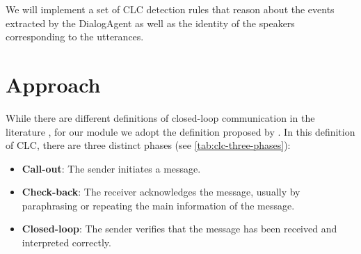 We will implement a set of CLC detection rules that reason about the events
extracted by the DialogAgent as well as the identity of the speakers
corresponding to the utterances.


\section{Approach}

While there are different definitions of closed-loop communication in the
literature \cite{abd2018closed, yee2017role}, for our module we adopt the
definition proposed by \citet{Hargestam.ea:2013}.  In this definition of CLC,
there are three distinct phases (see \autoref{tab:clc-three-phases}):

\begin{itemize}

    \item \textbf{Call-out}: The sender initiates a message.

    \item \textbf{Check-back}: The receiver acknowledges the message, usually
        by paraphrasing or repeating the main information of the message.

    \item \textbf{Closed-loop}: The sender verifies that the message has been
                received and interpreted correctly.

\end{itemize}

\newcommand{\utteranceone}{\textit{This is Green. I’m finishing this side, blue, could you check the central for victims? }}
\newcommand{\utterancetwo}{\textit{This is Blue. Okay. I’ll go check the central for victims.}}
\newcommand{\utterancethree}{\textit{All right, thank you, Blue.}}

